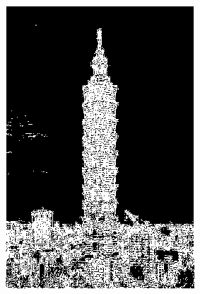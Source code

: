 \documentclass[12pt,a4paper]{report}
\begin{document}
\begin{figure}[!htb]
\begin{subfigure}{0.45\linewidth}
    \includegraphics[width=1\linewidth]{output/taipei101_Q4_t_32.png}
  \end{subfigure}
  \begin{subfigure}{0.45\linewidth}

\end{subfigure}
\end{figure}
\end{document}
